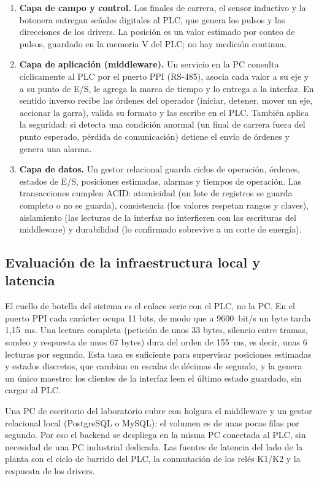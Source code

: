 \documentclass[a4paper,11pt]{article}
\begin{document}
\begin{enumerate}
\item \textbf{Capa de campo y control.} Los finales de carrera, el sensor inductivo y la botonera entregan señales digitales al PLC, que genera los pulsos y las direcciones de los drivers. La posición es un valor estimado por conteo de pulsos, guardado en la memoria V del PLC; no hay medición continua.
\item \textbf{Capa de aplicación (middleware).} Un servicio en la PC consulta cíclicamente al PLC por el puerto PPI (RS-485), asocia cada valor a su eje y a su punto de E/S, le agrega la marca de tiempo y lo entrega a la interfaz. En sentido inverso recibe las órdenes del operador (iniciar, detener, mover un eje, accionar la garra), valida su formato y las escribe en el PLC. También aplica la seguridad: si detecta una condición anormal (un final de carrera fuera del punto esperado, pérdida de comunicación) detiene el envío de órdenes y genera una alarma.
\item \textbf{Capa de datos.} Un gestor relacional guarda ciclos de operación, órdenes, estados de E/S, posiciones estimadas, alarmas y tiempos de operación. Las transacciones cumplen ACID: atomicidad (un lote de registros se guarda completo o no se guarda), consistencia (los valores respetan rangos y claves), aislamiento (las lecturas de la interfaz no interfieren con las escrituras del middleware) y durabilidad (lo confirmado sobrevive a un corte de energía).
\end{enumerate}

\subsection{Evaluación de la infraestructura local y latencia}
El cuello de botella del sistema es el enlace serie con el PLC, no la PC. En el puerto PPI cada carácter ocupa 11 bits, de modo que a 9600~bit/s un byte tarda 1,15~ms. Una lectura completa (petición de unos 33 bytes, silencio entre tramas, sondeo y respuesta de unos 67 bytes) dura del orden de 155~ms, es decir, unas 6 lecturas por segundo. Esta tasa es suficiente para supervisar posiciones estimadas y estados discretos, que cambian en escalas de décimas de segundo, y la genera un único maestro: los clientes de la interfaz leen el último estado guardado, sin cargar al PLC.

Una PC de escritorio del laboratorio cubre con holgura el middleware y un gestor relacional local (PostgreSQL o MySQL): el volumen es de unas pocas filas por segundo. Por eso el backend se despliega en la misma PC conectada al PLC, sin necesidad de una PC industrial dedicada. Las fuentes de latencia del lado de la planta son el ciclo de barrido del PLC, la conmutación de los relés K1/K2 y la respuesta de los drivers.
\end{document}
